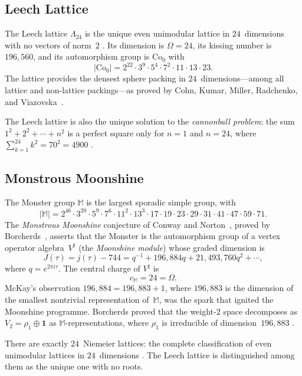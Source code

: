 \documentclass[11pt,a4paper]{article}
\theoremstyle{plain}
\theoremstyle{remark}
\renewcommand{\Omega}{\varOmega}
\newcommand{\abs}[1]{\lvert #1 \rvert}
\begin{document}
\subsection{Leech Lattice}
\label{sec:path-leech}

The Leech lattice $\Lambda_{24}$ is the unique even unimodular lattice in
$24$~dimensions with no vectors of norm~$2$
\cite{conway-sloane1999}.
Its dimension is $\Omega=24$, its kissing number is $196{,}560$, and its
automorphism group is $\mathrm{Co}_0$ with
\[
  \abs{\mathrm{Co}_0}
  = 2^{22}\cdot 3^9\cdot 5^4\cdot 7^2\cdot 11\cdot 13\cdot 23.
\]
The lattice provides the densest sphere packing in
$24$~dimensions---among all lattice and non-lattice
packings---as proved by Cohn, Kumar, Miller, Radchenko, and
Viazovska~\cite{cohn-kumar-miller-radchenko-viazovska2017}.

The Leech lattice is also the unique solution to the \emph{cannonball problem}:
the sum $1^2+2^2+\cdots+n^2$ is a perfect square only for $n=1$ and
$n=24$, where $\sum_{k=1}^{24}k^2 = 70^2 = 4900$
\cite{lucas1875}.

\subsection{Monstrous Moonshine}
\label{sec:path-moonshine}

The Monster group $\mathbb{M}$ is the largest sporadic simple group,
with
\[
  \abs{\mathbb{M}} = 2^{46}\cdot 3^{20}\cdot 5^9\cdot 7^6\cdot 11^2
  \cdot 13^3\cdot 17\cdot 19\cdot 23\cdot 29\cdot 31\cdot 41\cdot 47
  \cdot 59\cdot 71.
\]
The \emph{Monstrous Moonshine} conjecture of Conway and
Norton~\cite{conway-norton1979}, proved by Borcherds~\cite{borcherds1992},
asserts that the Monster is the automorphism group of a vertex operator
algebra~$V^\natural$ (the \emph{Moonshine module})
\cite{frenkel-lepowsky-meurman1988} whose graded dimension is
\[
  J(\tau) = j(\tau)-744 = q^{-1}+196{,}884q+21{,}493{,}760q^2+\cdots,
\]
where $q=e^{2\pi i\tau}$.  The central charge of $V^\natural$ is
\[
  c_{\mathbb{M}} = 24 = \Omega.
\]
McKay's observation $196{,}884=196{,}883+1$, where $196{,}883$ is the
dimension of the smallest nontrivial representation of~$\mathbb{M}$,
was the spark that ignited the Moonshine programme.
Borcherds proved that the weight-$2$ space decomposes as
$V_2 = \rho_1\oplus\mathbf{1}$ as $\mathbb{M}$-representations, where
$\rho_1$ is irreducible of dimension~$196{,}883$ \cite{borcherds1992}.

There are exactly $24$~Niemeier lattices: the complete classification
of even unimodular lattices in $24$~dimensions \cite{niemeier1973}.
The Leech lattice is distinguished among them as the unique one with
no roots.
\end{document}
